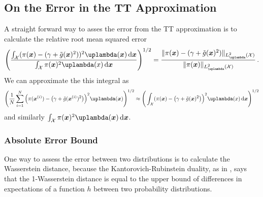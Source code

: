 \subsection{On the Error in the TT Approximation}
A straight forward way to asses the error from the TT approximation is to calculate the relative root mean squared error
\begin{align}
	\Bigg( \frac{ \int_{\mathcal{X}} (\pi(\bm{x}) - (\gamma + \tilde{g}(\bm{x})^2))^2 \uplambda(\bm{x}) \diff \bm{x}}{ \int_{\mathcal{X}} \pi(\bm{x})^2 \uplambda(x)  \diff \bm{x} } \Bigg)^{1/2} =	\frac{\lVert 	\pi(\bm{x}) - (\gamma + \tilde{g}(\bm{x})^2)  \rVert_{L^2_{\uplambda}(\mathcal{X})}}{\lVert 	\pi(\bm{x}) \rVert_{L^2_{\uplambda}(\mathcal{X})}  } \, .
\end{align}
We can approximate the this integral as 
\begin{align}
	\Bigg( \frac{1}{N} \sum^{N}_{i =1} \Big(\pi(\bm{x}^{(i)}) - \big(\gamma + \tilde{g}(\bm{x}^{(i)})^2\big)\Big)^2 \uplambda(\bm{x})\Bigg)^{1/2}    \approx \Bigg(  \int_{\mathcal{X}} (\pi(\bm{x}) - \big(\gamma + \tilde{g}(\bm{x})^2\big)\Big)^2 \uplambda(x) \diff \bm{x} \Bigg)^{1/2} 
\end{align}
and similarly $\int_{\mathcal{X}} \pi(\bm{x})^2 \uplambda(\bm{x})  \diff \bm{x}$.


\subsubsection{Absolute Error Bound}
One way to assess the error between two distributions is to calculate the Wasserstein distance, because the Kantorovich-Rubinstein duality, as in \cite{thickstun2019kantorovich, Ambrosio2024Kanta}, says that the 1-Wasserstein distance is equal to the upper bound of differences in expectations of a function $h$ between two probability distributions.

